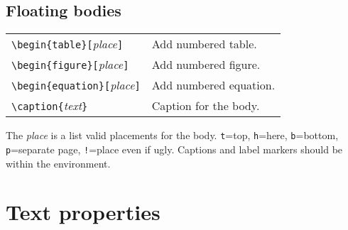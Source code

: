 \subsection{Floating bodies}
\begin{tabular}{@{}p{\the\MyLen}%
                @{}p{\linewidth-\the\MyLen}@{}}
\verb!\begin{table}[!\textit{place}\verb!]!     &  Add numbered table. \\
\verb!\begin{figure}[!\textit{place}\verb!]!    &  Add numbered figure. \\
\verb!\begin{equation}[!\textit{place}\verb!]!  &  Add numbered equation. \\
\verb!\caption{!\textit{text}\verb!}!           &  Caption for the body. \\
\end{tabular}

The \textit{place} is a list valid placements for the body.  \texttt{t}=top,
\texttt{h}=here, \texttt{b}=bottom, \texttt{p}=separate page, \texttt{!}=place even if ugly.  Captions and label markers should be within the environment.


\section{Text properties}

